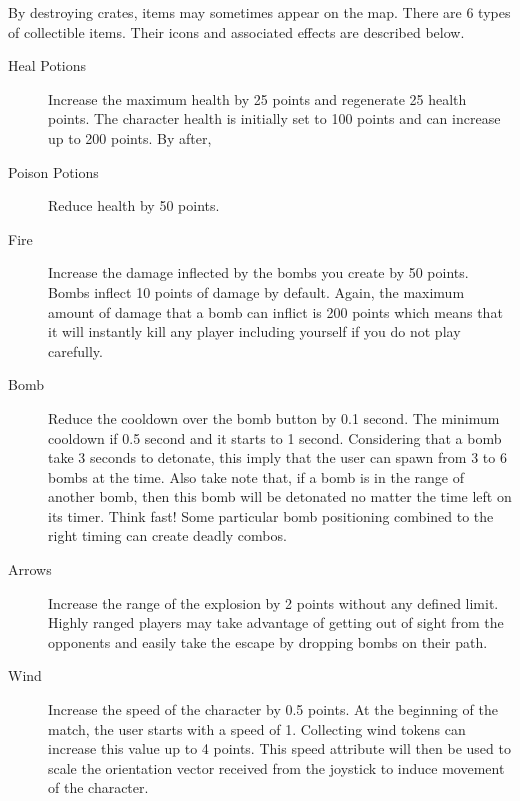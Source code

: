 By destroying crates, items may sometimes appear on the map. There are 6 types of collectible items. Their icons and associated effects are described below.
\begin{description}
\item [Heal Potions] Increase the maximum health by 25 points and regenerate 25 health points. The character health is initially set to 100 points and can increase up to 200 points. By after,
\item [Poison Potions] Reduce health by 50 points.
\item [Fire] Increase the damage inflected by the bombs you create by 50 points. Bombs inflect 10 points of damage by default. Again, the maximum amount of damage that a bomb can inflict is 200 points which means that it will instantly kill any player including yourself if you do not play carefully.
\item [Bomb] Reduce the cooldown over the bomb button by 0.1 second. The minimum cooldown if 0.5 second and it starts to 1 second. Considering that a bomb take 3 seconds to detonate, this imply that the user can spawn from 3 to 6 bombs at the time. Also take note that, if a bomb is in the range of another bomb, then this bomb will be detonated no matter the time left on its timer. Think fast! Some particular bomb positioning combined to the right timing can create deadly combos.
\item [Arrows] Increase the range of the explosion by 2 points without any defined limit. Highly ranged players may take advantage of getting out of sight from the opponents and easily take the escape by dropping bombs on their path.
\item [Wind] Increase the speed of the character by 0.5 points. At the beginning of the match, the user starts with a speed of 1. Collecting wind tokens can increase this value up to 4 points. This speed attribute will then be used to scale the orientation vector received from the joystick to induce movement of the character.
\end{description}
